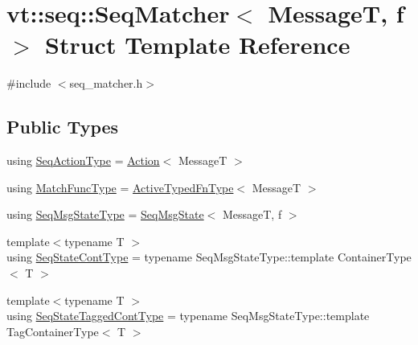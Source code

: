\hypertarget{structvt_1_1seq_1_1_seq_matcher}{}\section{vt\+:\+:seq\+:\+:Seq\+Matcher$<$ MessageT, f $>$ Struct Template Reference}
\label{structvt_1_1seq_1_1_seq_matcher}


{\ttfamily \#include $<$seq\+\_\+matcher.\+h$>$}

\subsection*{Public Types}
\begin{DoxyCompactItemize}
\item 
using \hyperlink{structvt_1_1seq_1_1_seq_matcher_a180f9f54ad9d6d65893a36fe8b5b89e3}{Seq\+Action\+Type} = \hyperlink{structvt_1_1seq_1_1_action}{Action}$<$ MessageT $>$
\item 
using \hyperlink{structvt_1_1seq_1_1_seq_matcher_a9b81f48a020c317f24cc13f4ec6295dc}{Match\+Func\+Type} = \hyperlink{namespacevt_a54eefd5373739c7365058b0d22fea6e2}{Active\+Typed\+Fn\+Type}$<$ MessageT $>$
\item 
using \hyperlink{structvt_1_1seq_1_1_seq_matcher_ac01eb781503d3813043a3f417848f519}{Seq\+Msg\+State\+Type} = \hyperlink{structvt_1_1seq_1_1_seq_msg_state}{Seq\+Msg\+State}$<$ MessageT, f $>$
\item 
{\footnotesize template$<$typename T $>$ }\\using \hyperlink{structvt_1_1seq_1_1_seq_matcher_ad8e84a5a494218cd582d8467552b5ff7}{Seq\+State\+Cont\+Type} = typename Seq\+Msg\+State\+Type\+::template Container\+Type$<$ T $>$
\item 
{\footnotesize template$<$typename T $>$ }\\using \hyperlink{structvt_1_1seq_1_1_seq_matcher_aeddaef880aa6f0dcc59486374d59a4cb}{Seq\+State\+Tagged\+Cont\+Type} = typename Seq\+Msg\+State\+Type\+::template Tag\+Container\+Type$<$ T $>$
\end{DoxyCompactItemize}
